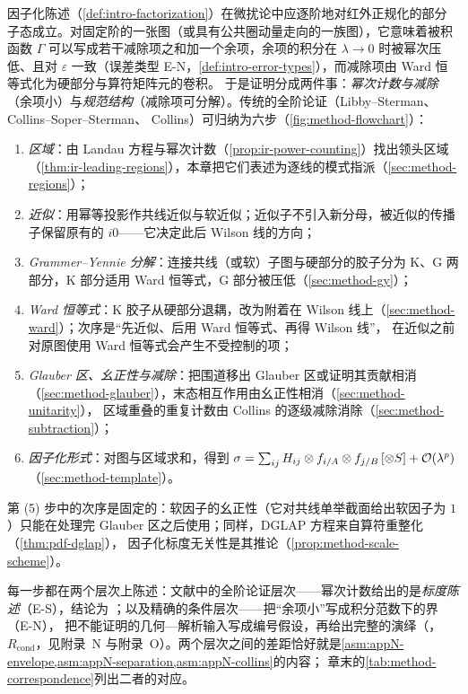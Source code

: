 因子化陈述（\cref{def:intro-factorization}）在微扰论中应逐阶地对红外正规化的部分子态成立。对固定阶的一张图（或具有公共圈动量走向的一族图），它意味着被积函数 $\Gamma$
可以写成若干减除项之和加一个余项，余项的积分在 $\lambda\to0$ 时被幂次压低、且对 $\varepsilon$ 一致（误差类型 E-N，\cref{def:intro-error-types}），而减除项由 Ward 恒等式化为硬部分与算符矩阵元的卷积。
于是证明分成两件事：\emph{幂次计数与减除}（余项小）与\emph{规范结构}（减除项可分解）。传统的全阶论证（Libby--Sterman\cite{LibbySterman1978a}、Collins--Soper--Sterman\cite{CollinsSoperSterman1989}、
Collins\cite{Collins2011}）可归纳为六步（\cref{fig:method-flowchart}）：
\begin{enumerate}[label=(\arabic*),leftmargin=2.2em,itemsep=0pt,topsep=2pt]
\item \emph{区域}：由 Landau 方程与幂次计数（\cref{prop:ir-power-counting}）找出领头区域（\cref{thm:ir-leading-regions}），本章把它们表述为逐线的模式指派（\cref{sec:method-regions}）；
\item \emph{近似}：用幂等投影作共线近似与软近似；近似子不引入新分母，被近似的传播子保留原有的 $i0$——它决定此后 Wilson 线的方向；
\item \emph{Grammer--Yennie 分解}：连接共线（或软）子图与硬部分的胶子分为 K、G 两部分，K 部分适用 Ward 恒等式，G 部分被压低（\cref{sec:method-gy}）；
\item \emph{Ward 恒等式}：K 胶子从硬部分退耦，改为附着在 Wilson 线上（\cref{sec:method-ward}）；次序是“先近似、后用 Ward 恒等式、再得 Wilson 线”，
  在近似之前对原图使用 Ward 恒等式会产生不受控制的项\cite{CollinsSoperSterman1989,Labastida:1984gy}；
\item \emph{Glauber 区、幺正性与减除}：把围道移出 Glauber 区或证明其贡献相消（\cref{sec:method-glauber}），末态相互作用由幺正性相消（\cref{sec:method-unitarity}），
  区域重叠的重复计数由 Collins 的逐级减除消除（\cref{sec:method-subtraction}）；
\item \emph{因子化形式}：对图与区域求和，得到 $\sigma=\sum_{ij}H_{ij}\otimes f_{i/A}\otimes f_{j/B}\,[\otimes S]+\mathcal{O}\!\left(\lambda^p\right)$（\cref{sec:method-template}）。
\end{enumerate}
第 (5) 步中的次序是固定的：软因子的幺正性（它对共线单举截面给出软因子为 $1$）只能在处理完 Glauber 区之后使用；同样，DGLAP 方程来自算符重整化（\cref{thm:pdf-dglap}），
因子化标度无关性是其推论（\cref{prop:method-scale-scheme}）。

每一步都在两个层次上陈述：文献中的全阶论证层次——幂次计数给出的是\emph{标度陈述}（E-S），结论为 \tagA；以及精确的条件层次——把“余项小”写成积分范数下的界（E-N），
把不能证明的几何—解析输入写成编号假设，再给出完整的演绎（\tagR，$R_{\mathrm{cond}}$，见附录~N 与附录~O）。两个层次之间的差距恰好就是\cref{asm:appN-envelope,asm:appN-separation,asm:appN-collins}的内容；
章末的\cref{tab:method-correspondence}列出二者的对应。


